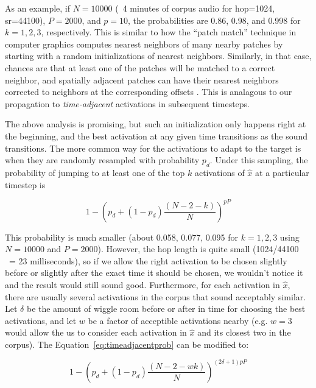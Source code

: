 \documentclass[letterpaper, 12pt]{article}
\begin{document}
As an example, if $N = 10000$ (~4 minutes of corpus audio for hop=1024, sr=44100), $P = 2000$, and $p=10$, the probabilities are 0.86, 0.98, and 0.998 for $k=1, 2, 3$, respectively.  This is similar to how the ``patch match'' technique in computer graphics \cite{Barnes:2009:PAR, Barnes:2010:TGP} computes nearest neighbors of many nearby patches by starting with a random initializations of nearest neighbors.  Similarly, in that case, chances are that at least one of the patches will be matched to a correct neighbor, and spatially adjacent patches can have their nearest neighbors corrected to neighbors at the corresponding offsets \cite{Barnes:2009:PAR}.  This is analagous to our propagation to {\em time-adjacent} activations in subsequent timesteps.

The above analysis is promising, but such an initialization only happens right at the beginning, and the best activation at any given time transitions as the sound transitions.  The more common way for the activations to adapt to the target is when they are randomly resampled with probability $p_d$.  Under this sampling, the probability of jumping to at least one of the top $k$ activations of $\hat{x}$ at a particular timestep is 

\begin{equation}
    \label{eq:timeadjacentprob}
    1 - \left( p_d + (1-p_d) \frac{(N-2-k)}{N} \right)^{pP}
\end{equation}

This probability is much smaller (about 0.058, 0.077, 0.095 for $k = 1, 2, 3$ using $N=10000$ and $P=2000$).  However, the hop length is quite small (1024/44100 ~= 23 milliseconds), so if we allow the right activation to be chosen slightly before or slightly after the exact time it should be chosen, we wouldn't notice it and the result would still sound good.  Furthermore, for each activation in $\hat{x}$, there are usually several activations in the corpus that sound acceptably similar.  Let $\delta$ be the amount of wiggle room before or after in time for choosing the best activations, and let $w$ be a factor of acceptible activations nearby (e.g. $w=3$ would allow the us to consider each activation in $\hat{x}$ and its closest two in the corpus).  The Equation~\ref{eq:timeadjacentprob} can be modified to:

\begin{equation}
    \label{eq:timeadjacentprobmodified}
    1 - \left( p_d + (1-p_d) \frac{(N-2-wk)}{N} \right)^{(2 \delta +1)pP}
\end{equation}
\end{document}
